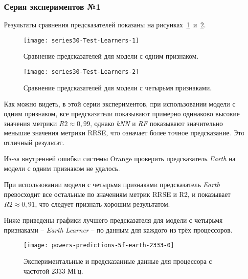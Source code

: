 \subsubsection{Серия экспериментов №1}

Результаты сравнения предсказателей показаны на рисунках~\ref{img:series30-Test-Learners-1}~и~\ref{img:series30-Test-Learners-2}.

\begin{figure}[H]
    \begin{center}
            \texttt{[image: series30-Test-Learners-1]}
            \caption{Сравнение предсказателей для модели с одним признаком.} %
            \label{img:series30-Test-Learners-1} %
    \end{center}
\end{figure}

\begin{figure}[H]
    \begin{center}
            \texttt{[image: series30-Test-Learners-2]}
            \caption{Сравнение предсказателей для модели с четырьмя признаками.}
            \label{img:series30-Test-Learners-2}
    \end{center}
\end{figure}

Как можно видеть, в этой серии экспериментов, при использовании модели с одним признаком, все предсказатели показывают примерно одинаково высокие значения метрики $R2 \approx 0,99$, однако \textit{kNN} и \textit{RF} показывают значительно меньшие значения метрики RRSE, что означает более точное предсказание. Это отличный результат.

Из-за внутренней ошибки системы Orange проверить предсказатель \textit{Earth} на модели с одним признаком не удалось.

При использовании модели с четырьмя признаками предсказатель \textit{Earth} превосходит все остальные по значениям метрик RRSE и R2, и показывает $R2 \approx 0,91$, что следует признать хорошим результатом.

Ниже приведены графики лучшего предсказателя для модели с четырьмя признаками -- \textit{Earth Learner} -- по данным для каждого из трёх процессоров.

\begin{figure}[H]
    \begin{center}
        \texttt{[image: powers-predictions-5f-earth-2333-0]}
        \caption{Экспериментальные и предсказанные данные для процессора с частотой 2333 МГц.}
        \label{img:powers-predictions-5f-earth-2333-0}
    \end{center}
\end{figure}

